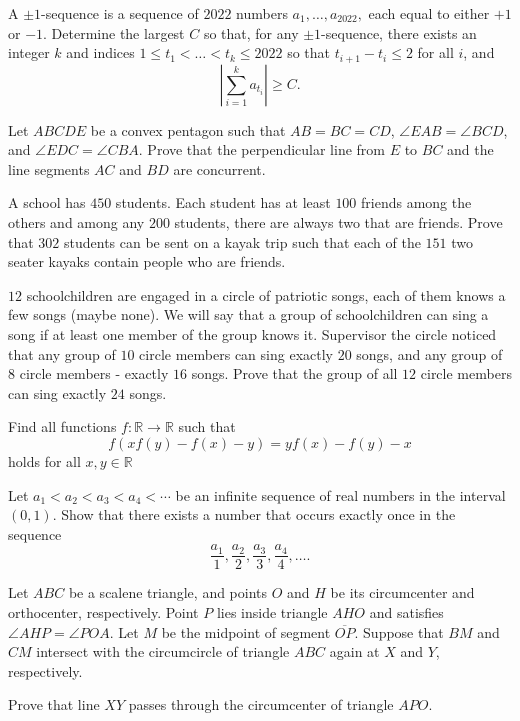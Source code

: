 \documentclass[11pt]{scrartcl}
\begin{document}
\begin{problem}[7948249970111159954]
	A $\pm 1$-sequence is a sequence of $2022$ numbers $a_1, \ldots, a_{2022},$ each equal to either $+1$ or $-1$. Determine the largest $C$ so that, for any $\pm 1$-sequence, there exists an integer $k$ and indices $1 \le t_1 < \ldots < t_k \le 2022$ so that $t_{i+1} - t_i \le 2$ for all $i$, and$$\left| \sum_{i = 1}^{k} a_{t_i} \right| \ge C.$$
\end{problem}
\begin{problem}[7997372712267182584]
Let $ABCDE$ be a convex pentagon such that $AB=BC=CD$, $\angle{EAB}=\angle{BCD}$, and $\angle{EDC}=\angle{CBA}$. Prove that the perpendicular line from $E$ to $BC$ and the line segments $AC$ and $BD$ are concurrent.
\end{problem}
\begin{problem}[8005762280394288133]
A school has $450$ students. Each student has at least $100$ friends among the others and among any $200$ students, there are always two that are friends. Prove that $302$ students can be sent on a kayak trip such that each of the $151$ two seater kayaks contain people who are friends.
\end{problem}
\begin{problem}[8024569764169071557]
$12$ schoolchildren are engaged in a circle of patriotic songs, each of them knows a few songs (maybe none). We will say that a group of schoolchildren can sing a song if at least one member of the group knows it. Supervisor the circle noticed that any group of $10$ circle members can sing exactly $20$ songs, and any group of $8$ circle members - exactly $16$ songs. Prove that the group of all $12$ circle members can sing exactly $24$ songs.
\end{problem}
\begin{problem}[8044666255052297783]
	Find all functions $ f: \mathbb{R} \to \mathbb{R} $ such that$$ f\left(xf\left(y\right)-f\left(x\right)-y\right) = yf\left(x\right)-f\left(y\right)-x $$holds for all $ x,y \in \mathbb{R} $
\end{problem}
\begin{problem}[8048961544243923335]
Let $a_1<a_2<a_3<a_4<\cdots$ be an infinite sequence of real numbers in the interval $(0,1)$. Show that there exists a number that occurs exactly once in the sequence
\[ \frac{a_1}{1},\frac{a_2}{2},\frac{a_3}{3},\frac{a_4}{4},\ldots.\]
\end{problem}
\begin{problem}[8053761138620448460]
	Let $ABC$ be a scalene triangle, and points $O$ and $H$ be its circumcenter and orthocenter, respectively. Point $P$ lies inside triangle $AHO$ and satisfies $\angle AHP = \angle POA$. Let $M$ be the midpoint of segment $\overline{OP}$. Suppose that $BM$ and $CM$ intersect with the circumcircle of triangle $ABC$ again at $X$ and $Y$, respectively.

Prove that line $XY$ passes through the circumcenter of triangle $APO$.
\end{problem}
\end{document}
